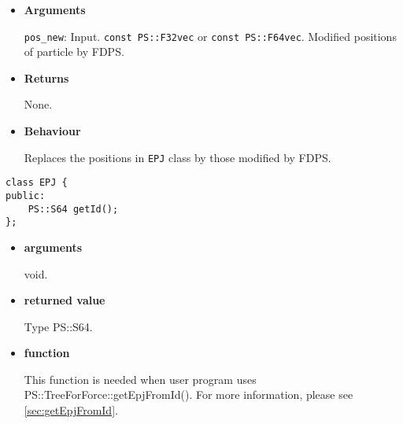 \begin{itemize}

\item {\bf Arguments}

  \texttt{pos\_new}: Input. \texttt{const PS::F32vec} or \texttt{const PS::F64vec}.
  Modified positions of particle by FDPS.

\item {\bf Returns}

  None.
  
\item {\bf Behaviour}

  Replaces the positions in \texttt{EPJ} class by those modified by FDPS.

\end{itemize}


\label{sec:EPJ:getId}

\begin{screen}
\begin{verbatim}
class EPJ {
public:
    PS::S64 getId();
};
\end{verbatim}
\end{screen}

\begin{itemize}

\item {\bf arguments}

void.

\item {\bf returned value}

Type PS::S64.
  
\item {\bf function}

This function is needed when user program uses PS::TreeForForce::getEpjFromId().
For more information, please see \ref{sec:getEpjFromId}.



\end{itemize}



